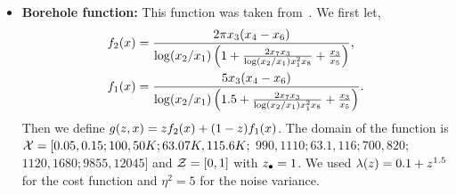 \begin{itemize}[leftmargin=0.0in]
For the $3$ dimensional case we used $\cost(z) = 0.05 + (1 - 0.05)z_1^3z_2^2$,
$\eta^2=0.01$ and,
\[
A = 
\begin{bmatrix}
3 & 10 & 30 \\
0.1 & 10 & 35 \\
3 & 10 & 30 \\
0.1 & 10 & 35 
\end{bmatrix},
\quad
P = 10^{-4} \times
\begin{bmatrix}
3689 & 1170 & 2673 \\
4699 & 4387 & 7470 \\
1091 & 8732 & 5547 \\
381 & 5743 & 8828
\end{bmatrix}.
\]
For the $3$ dimensional case we used $\cost(z) = 0.05 + (1 -
0.05)z_1^3z_2^2z_3^{1.5}z_4^{1}$, $\eta^2=0.05$ and,
\[
A = 
\begin{bmatrix}
10 & 3 & 17 & 3.5 & 1.7 & 8 \\
0.05 & 10 & 17 & 0.1 & 8 & 14 \\
3 & 3.5 & 1.7 & 10 & 17 & 8 \\
17 & 8 & 0.05 & 10 & 0.1 & 14 
\end{bmatrix},
\;\;
P = 10^{-4} \times
\begin{bmatrix}
1312 & 1696 & 5569 &  124 & 8283 & 5886 \\
2329 & 4135 & 8307 & 3736 & 1004 & 9991 \\
2348 & 1451 & 3522 & 2883 & 3047 & 6650 \\
4047 & 8828 & 8732 & 5743 & 1091 &  381 \\
\end{bmatrix}.
\]




\item[]
\textbf{Borehole function:}
This function was taken from~\citep{xiong13highAccuracy}.
We first let,
\begin{align*}
f_2(x) &= \frac{2\pi x_3(x_4-x_6)}
  {\log(x_2/x_1) \left(1 + \frac{2x_7x_3}{\log(x_2/x_1)x_1^2x_8} +
    \frac{x_3}{x_5} \right)}, \\
f_1(x) &= \frac{5 x_3(x_4-x_6)}
  {\log(x_2/x_1) \left(1.5 + \frac{2x_7x_3}{\log(x_2/x_1)x_1^2x_8} +
    \frac{x_3}{x_5} \right)}. 
\end{align*}
Then we define $g(z,x) = zf_2(x) + (1-z)f_1(x)$.
The domain of the function is $\mathcal{X} = [0.05, 0.15; 100, 50K; 63.07K, 115.6K;$
$990, 1110; 63.1, 116; 700, 820;$ $1120, 1680; 9855, 12045]$
and $\mathcal{Z}=[0,1]$ with $z_{\bullet} = 1$.
We used $\lambda(z) = 0.1 + z^{1.5}$ for the cost function and
$\eta^2=5$ for the noise variance.


\end{itemize}
